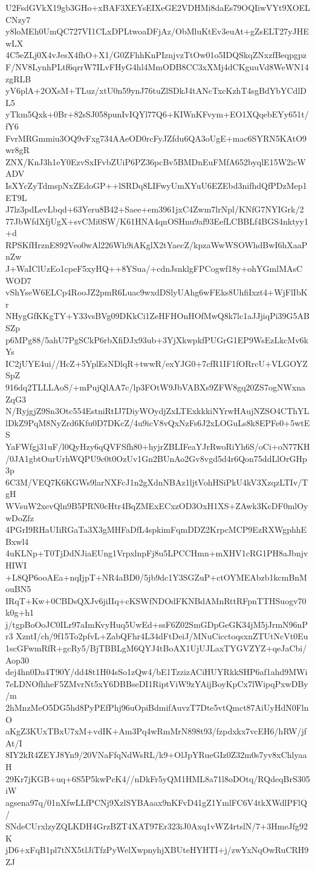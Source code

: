 U2FsdGVkX19gb3GHo+xBAF3XEYsEIXeGE2VDHMi8daEs79OQIiwVYt9XOELCNzy7
y8loMEh0UmQC727VI1CLxDPLtwoaDFjAz/ObMluKtEv3euAt+gZsELT27yJHEwLX
4C5eZLj0X4vJesX4fhO+X1/G0ZFhhKnPIznjvzTtOw01o5IDQSkqZNxzfBeqpgpz
F/NV8LynhPLtf6qrrW7ILvFHyG4hl4MmODB8CC3xXMj4dCKguuVd8WeWN14zgRLB
yV6plA+2OXsM+TLuz/xtU0n59ynJ76tuZlSDkJ4tANcTxcKzhT4sgBdYbYCdlDL5
yTkm5Qxk+0Br+82sSJ058punIvIQYl77Q6+KIWnKFvym+EO1XQqebEYy651t/fY6
FvrMRGmmiu3OQ9vFxg734AAeOD0rcFyJZfdu6QA3oUgE+mac6SYRN5KAtO9wr8gR
ZNX/KnJ3h1eY0EzvSxIFvbZUiP6PZ36pcBv5BMDnEuFMfA652byqlE15W2icWADV
IsXYcZyTdmspNxZEdoGP++lSRDq8LIFwyUmXYuU6EZEbd3nifhdQfPDzMep1ET9L
J7lz3pdLevLbqd+63Yeru8B42+Saee+em3961jxC4Zwm7lrNpl/KNfG7NYIGrk/2
77JbWfdXfjUgX+svCMi0SW/K61HNA4qnOSHnu9af93EefLCBBLf4BGS4nktyy1+d
RPSKfHrznE892Veo0wAl226Wh9iAKglX2tYaecZ/kpzaWwWSOWhdBwI6hXaaPnZw
J+WaIClUzEo1cpeF5xyHQ++8YSua/+cdnJsnklgFPCogwf18y+ohYGmlMAsCWOD7
vShYseW6ELCp4RooJZ2pmR6Luac9wxdDSlyUAhg6wFEks8UhfiIxzt4+WjFlIbKr
NHygGfKKgTY+Y33vsBVg09DKkCi1ZeHFHOnHOfMwQ8k7lc1aJJjiqPi39G5ABSZp
p6MPg88/5ahU7PgSCkP6rbXfiDJx93ub+3YjXkwpkfPUGrG1EP9WsEzLkcMv6kYs
IC2jUYE4ui//HcZ+5YplEsNDlqR+twwR/exYJG0+7cfR1IF1fORrcU+VLGOYZSpZ
916dq2TLLLAoS/+mPujQlAA7c/lp3FOtW9JbVABXs9ZFW8gq20ZS7ogNWxnaZqG3
N/RyjgjZ9Sn3Otc554EstniRtIJ7DiyWOydjZxLTExkkkiNYrwHAujNZSO4CThYL
lDkZ9PqM8NyZrd6Kfu0D7DKcZ/4u9icV8vQxNzFs6J2xLOGuLs8k8EPFe0+5wtES
YaFWfgj31uF/l0QyHzy6qQVFSfh80+hyjrZBLIFeaYJrRwoRiYh6S/oCi+oN77KH
/0JA1gbtOurUrhWQPU9c0t0OzUv1Gn2BUnAo2Gv8vgd5d4r6Qon75ddLlOrGHp3p
6C3M/VEQ7K6KGWs9larNXFcJ1n2gXdnNBAz1ljtVohHSiPkU4kV3XzqzLTIv/TgH
WVsuW2xevQln9B5PRN0cHtr4BqZMExECxzOD3OxH1XS+ZAwk3KcDF0mlOywDoZfz
4PGrI9RHaUIiRGaTa3X3gMHFaDfL4spkimFqmDDZ2KrpcMCP9EzRXWgphhEBxwl4
4uKLNp+T0TjDdNJiaEUng1VrpxlnpFj8u5LPCCHmn+mXHV1cRG1PH8aJbnjvHIWI
+L8QP6ooAEa+nqIjpT+NR4aBD0/5jb9dc1Y3SGZuP+ctOYMEAbzb1kcmBnMouBN5
IRqT+Kw+0CBDsQXJv6jiIIq+cKSWfNDOdFKNBdAMnRttRFpnTTHSuogv70k0g+h1
j/tgpBoOoJC0ILr97aImKvyHuq5UwEd+ssF6Z02SmGDpGeGK34jM5jJrmN96nPr3
XzntI/ch/9f15To2pfvL+ZabQFhr4L34dFtDeiJ/MNuCicctoqsxnZTUtNcVt0Eu
1scGFwmRfR+gcRy5/BjTBBLgM6QYJ4tBoAX1UjUJLaxTYGVZYZ+qeJaCbi/Aop30
dej4hn0Da4T90Y/dd48t1H04sSo1zQw4/bE1TzzizACiHUYRkkSHP6af1ahd9MWi
7eLDNOfhheF5ZMvrNt5xY6DBBseDI1RiptViW9zYAijBoyKpCx7lWipqPxwDBy/m
2hMnzMeO5DG5hd8PyPEfPhj96uOpiBdmifAuvzT7Dte5vtQmct87AiUyHdN0FlnO
aKgZ3KUxTBxU7xM+vdIK+Am3Pq4wRmMrN898t93/fzpdxkx7vcEH6/hRW/jfAt/I
8IY2kR4ZEYJ8Yn9/20VNaFfqNdWsRL/k9+OlJpYRueGIz0Z32m0s7yv8xChlyaaH
29Kr7jKGB+uq+6S5P5kwPcK4//nDkFr5yQM1HML8a71l8oDOtq/RQdeqBrS305iW
agsena97q/01nXfwLLfPCNj9XzlSYBAaax9nKFvD41gZ1YmlFC6V4tkXWdlPFlQ/
SNdeCUrxlzyZQLKDH4GrzBZT4XAT97Er323iJ0Axq1vWZ4rtslN/7+3HmeJfg92K
jD6+xFqB1pl7tNX5tlJiTfzPyWelXwpnyhjXBUteHYHTI+j/zwYxNqOwRuCRH9ZJ
